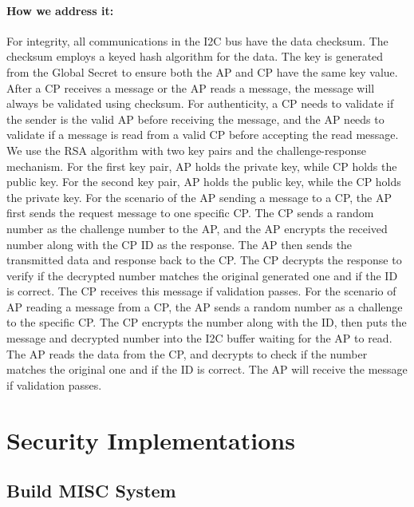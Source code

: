 \documentclass[11pt,oneside,onecolumn,letterpaper]{article}
\newcounter{alg}
\begin{document}
	\paragraph{How we address it:}
	For integrity,
	all communications in the I2C bus have the data checksum.
	The checksum employs a keyed hash algorithm for the data.
	The key is generated from the Global Secret to ensure both the AP and CP have the same key value.
	After a CP receives a message or the AP reads a message,
	the message will always be validated using checksum.
	For authenticity,
	a CP needs to validate if the sender is the valid AP before receiving the message,
	and the AP needs to validate if a message is read from a valid CP before accepting the read message.
	We use the RSA algorithm with two key pairs and the challenge-response mechanism.
	For the first key pair,
	AP holds the private key,
	while CP holds the public key.
	For the second key pair,
	AP holds the public key,
	while the CP holds the private key.
	For the scenario of the AP sending a message to a CP,
	the AP first sends the request message to one specific CP.
	The CP sends a random number as the challenge number to the AP,
	and the AP encrypts the received number along with the CP ID as the response.
	The AP then sends the transmitted data and response back to the CP.
	The CP decrypts the response to verify if the decrypted number matches the original generated one and if the ID is correct.
	The CP receives this message if validation passes.
	For the scenario of AP reading a message from a CP,
	the AP sends a random number as a challenge to the specific CP.
	The CP encrypts the number along with the ID,
	then puts the message and decrypted number into the I2C buffer waiting for the AP to read.
	The AP reads the data from the CP,
	and decrypts to check if the number matches the original one and if the ID is correct.
	The AP will receive the message if validation passes.
	
	
	\section{Security Implementations}
	
	
	\subsection{Build MISC System}
\end{document}
